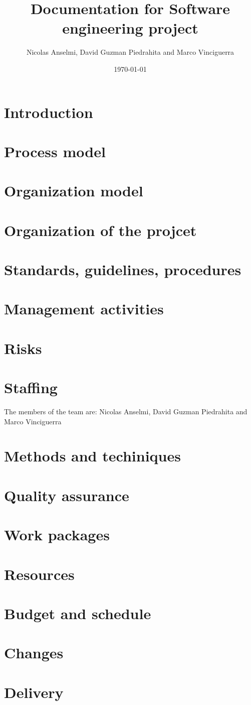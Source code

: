 \documentclass{article}
\title{Documentation for Software engineering project}
\author{Nicolas Anselmi, David Guzman Piedrahita and Marco Vinciguerra}
\date{\today}
\begin{document}
\maketitle

\section{Introduction}

\section{Process model}

\section{Organization model}

\section{Organization of the projcet}

\section{Standards, guidelines, procedures}

\section{Management activities}

\section{Risks}

\section{Staffing}
The members of the team are: Nicolas Anselmi, David Guzman Piedrahita and Marco Vinciguerra

\section{Methods and techiniques}

\section{Quality assurance}

\section{Work packages}


\section{Resources}

\section{Budget and schedule}

\section{Changes}

\section{Delivery}
\end{document}
